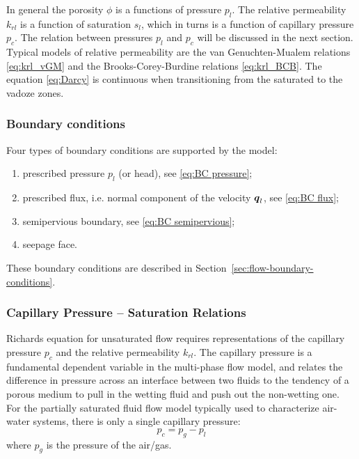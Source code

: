 In general the porosity $\phi$ is a functions of pressure $p_l$.
The relative permeability $k_{rl}$ is a function of saturation $s_l$,
which in turns is a function of capillary pressure $p_c$. 
The relation between pressures $p_l$ and $p_c$ will be discussed in the next section.
Typical models of relative permeability are 
the van Genuchten-Mualem relations \eqref{eq:krl_vGM} and 
the Brooks-Corey-Burdine relations \eqref{eq:krl_BCB}.
The equation \eqref{eq:Darcy} is continuous when transitioning from the saturated to the vadoze zones.

\subsubsection{Boundary conditions}  

Four types of boundary conditions are supported by the model:
\begin{enumerate}
\item
  prescribed pressure $p_l$ (or head), see \eqref{eq:BC pressure};
\item
  prescribed flux, i.e. normal component of the velocity ${\boldsymbol{q}}_l$, see \eqref{eq:BC flux};
\item
  semipervious boundary, see \eqref{eq:BC semipervious}; %
\item
  seepage face.
\end{enumerate}
These boundary conditions are described in Section~\ref{sec:flow-boundary-conditions}.


\subsubsection{Capillary Pressure -- Saturation Relations}  
\label{sec:richards-pc_s_relations}

Richards equation for unsaturated flow
requires representations of the capillary pressure $p_c$ and the relative permeability $k_{rl}$.  
The capillary pressure is a fundamental dependent variable in the multi-phase flow model, and
relates the difference in pressure across an interface between two
fluids to the tendency of a porous medium to pull in the wetting fluid
and push out the non-wetting one.
For the partially saturated fluid flow model typically used to
characterize air-water systems, 
there is only a single capillary pressure:
\begin{equation} \label{eq:GasLiquidCapillaryPressure}
  p_c = p_g - p_l
\end{equation}
where $p_g$ is the pressure of the air/gas. 

